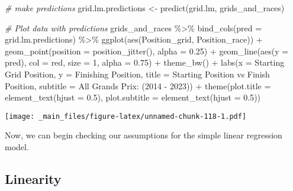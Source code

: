 \documentclass[
]{book}
\newenvironment{Shaded}{\begin{snugshade}}{\end{snugshade}}
\newcommand{\AttributeTok}[1]{\textcolor[rgb]{0.77,0.63,0.00}{#1}}
\newcommand{\CommentTok}[1]{\textcolor[rgb]{0.56,0.35,0.01}{\textit{#1}}}
\newcommand{\DecValTok}[1]{\textcolor[rgb]{0.00,0.00,0.81}{#1}}
\newcommand{\FloatTok}[1]{\textcolor[rgb]{0.00,0.00,0.81}{#1}}
\newcommand{\FunctionTok}[1]{\textcolor[rgb]{0.00,0.00,0.00}{#1}}
\newcommand{\NormalTok}[1]{#1}
\newcommand{\OtherTok}[1]{\textcolor[rgb]{0.56,0.35,0.01}{#1}}
\newcommand{\SpecialCharTok}[1]{\textcolor[rgb]{0.00,0.00,0.00}{#1}}
\newcommand{\StringTok}[1]{\textcolor[rgb]{0.31,0.60,0.02}{#1}}
\begin{document}
\begin{Shaded}
\begin{Highlighting}[]
\CommentTok{\# make predictions}
\NormalTok{grid.lm.predictions }\OtherTok{\textless{}{-}} \FunctionTok{predict}\NormalTok{(grid.lm, grids\_and\_races)}

\CommentTok{\# Plot data with predictions}
\NormalTok{grids\_and\_races }\SpecialCharTok{\%\textgreater{}\%}
  \FunctionTok{bind\_cols}\NormalTok{(}\AttributeTok{pred =}\NormalTok{ grid.lm.predictions) }\SpecialCharTok{\%\textgreater{}\%}
  \FunctionTok{ggplot}\NormalTok{(}\FunctionTok{aes}\NormalTok{(Position\_grid, Position\_race)) }\SpecialCharTok{+}
  \FunctionTok{geom\_point}\NormalTok{(}\AttributeTok{position =} \FunctionTok{position\_jitter}\NormalTok{(), }\AttributeTok{alpha =} \FloatTok{0.25}\NormalTok{) }\SpecialCharTok{+}
  \FunctionTok{geom\_line}\NormalTok{(}\FunctionTok{aes}\NormalTok{(}\AttributeTok{y =}\NormalTok{ pred), }\AttributeTok{col =} \StringTok{\textquotesingle{}red\textquotesingle{}}\NormalTok{,}
            \AttributeTok{size =} \DecValTok{1}\NormalTok{, }\AttributeTok{alpha =} \FloatTok{0.75}\NormalTok{) }\SpecialCharTok{+}
  \FunctionTok{theme\_bw}\NormalTok{() }\SpecialCharTok{+}
  \FunctionTok{labs}\NormalTok{(}\AttributeTok{x  =} \StringTok{\textquotesingle{}Starting Grid Position\textquotesingle{}}\NormalTok{,}
       \AttributeTok{y =} \StringTok{\textquotesingle{}Finishing Position\textquotesingle{}}\NormalTok{,}
       \AttributeTok{title =} \StringTok{\textquotesingle{}Starting Position vs Finish Position\textquotesingle{}}\NormalTok{,}
       \AttributeTok{subtitle =} \StringTok{\textquotesingle{}All Grands Prix: (2014 {-} 2023)\textquotesingle{}}\NormalTok{) }\SpecialCharTok{+}
  \FunctionTok{theme}\NormalTok{(}\AttributeTok{plot.title =} \FunctionTok{element\_text}\NormalTok{(}\AttributeTok{hjust =} \FloatTok{0.5}\NormalTok{),}
        \AttributeTok{plot.subtitle =} \FunctionTok{element\_text}\NormalTok{(}\AttributeTok{hjust =} \FloatTok{0.5}\NormalTok{))}
\end{Highlighting}
\end{Shaded}

\texttt{[image: \_main\_files/figure-latex/unnamed-chunk-118-1.pdf]}

Now, we can begin checking our assumptions for the simple linear regression model.

\hypertarget{linearity}{%
\subsection{Linearity}\label{linearity}}
\end{document}
